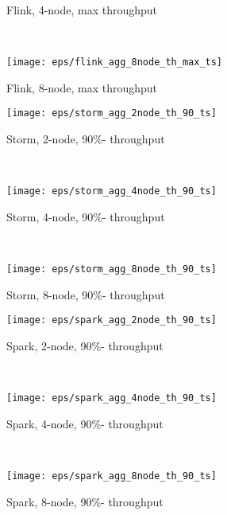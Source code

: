\begin{figure*}
\begin{subfigure}[b]{0.3\textwidth}
        \caption{Flink, 4-node, max   throughput }
    \end{subfigure}
    ~ 
    \begin{subfigure}[b]{0.3\textwidth}
        \texttt{[image: eps/flink\_agg\_8node\_th\_max\_ts]}

        \caption{Flink, 8-node, max   throughput }
        
    \end{subfigure}




    \begin{subfigure}[b]{0.3\textwidth}
        \texttt{[image: eps/storm\_agg\_2node\_th\_90\_ts]}

        \caption{Storm, 2-node,  90\%- throughput }
    \end{subfigure}
    ~ 
    \begin{subfigure}[b]{0.3\textwidth}
        \texttt{[image: eps/storm\_agg\_4node\_th\_90\_ts]}

        \caption{Storm, 4-node,  90\%- throughput }
    \end{subfigure}
    ~ 
    \begin{subfigure}[b]{0.3\textwidth}
        \texttt{[image: eps/storm\_agg\_8node\_th\_90\_ts]}

        \caption{Storm, 8-node,  90\%- throughput }
                \label{fig_storm_agg_8node_th_90_ts}
    \end{subfigure}



    \begin{subfigure}[b]{0.3\textwidth}
        \texttt{[image: eps/spark\_agg\_2node\_th\_90\_ts]}

        \caption{Spark, 2-node,  90\%- throughput }
    \end{subfigure}
    ~ 
    \begin{subfigure}[b]{0.3\textwidth}
        \texttt{[image: eps/spark\_agg\_4node\_th\_90\_ts]}

        \caption{Spark, 4-node,  90\%- throughput }
    \end{subfigure}
    ~ 
    \begin{subfigure}[b]{0.3\textwidth}
        \texttt{[image: eps/spark\_agg\_8node\_th\_90\_ts]}

        \caption{Spark, 8-node,  90\%- throughput }
        
    \end{subfigure}




\end{figure*}
